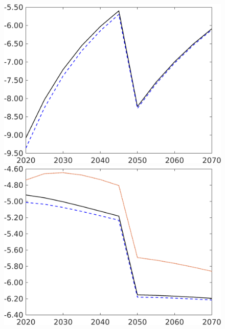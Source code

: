 \begin{figure}[h!!]
\begin{minipage}[]{0.32\textwidth}
	\end{minipage}
	\begin{minipage}[]{0.32\textwidth}
		\includegraphics[width=1\textwidth]{../../codding_model/own_basedOnFried/optimalPol_190722_tidiedUp/figures/all_10Aout22/snS_PercentageLfDynNT_noeff_Target_regime3_spillover0_noskill0_sep1_xgrowth0_PV1_etaa0.79_lgd0.png}
	\end{minipage}
	\begin{minipage}[]{0.32\textwidth}
		\includegraphics[width=1\textwidth]{../../codding_model/own_basedOnFried/optimalPol_190722_tidiedUp/figures/all_10Aout22/EY_PercentageLfDynNT_Target_regime3_spillover0_noskill0_sep1_xgrowth0_PV1_etaa0.79_lgd0.png}
	\end{minipage}
\end{figure} 


